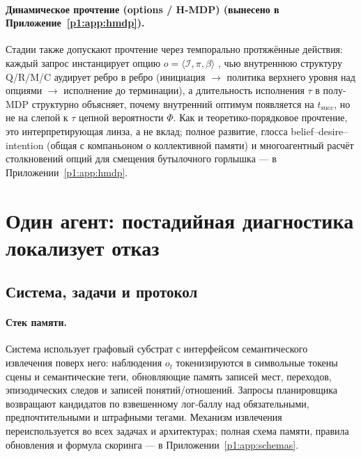 \documentclass{article}
\begin{document}
\paragraph{Динамическое прочтение (options / H-MDP) (вынесено в Приложение~\ref{p1:app:hmdp}).}
Стадии также допускают прочтение через темпорально протяжённые действия: каждый запрос инстанцирует опцию $o=\langle\mathcal{I},\pi,\beta\rangle$ \citep{sutton1999between}, чью внутреннюю структуру Q/R/M/C аудирует ребро в ребро (инициация $\to$ политика верхнего уровня над опциями $\to$ исполнение до терминации), а длительность исполнения $\tau$ в полу-MDP структурно объясняет, почему внутренний оптимум появляется на $t_{\mathrm{succ}}$, но не на слепой к $\tau$ цепной вероятности $\Phi$. Как и теоретико-порядковое прочтение, это интерпретирующая линза, а не вклад; полное развитие, глосса belief--desire--intention (общая с компаньоном о коллективной памяти) и многоагентный расчёт столкновений опций для смещения бутылочного горлышка --- в Приложении~\ref{p1:app:hmdp}.

\section{Один агент: постадийная диагностика локализует отказ}
\label{p1:sec:single}

\subsection{Система, задачи и протокол}
\label{p1:sec:single-setup}

\paragraph{Стек памяти.}
Система использует графовый субстрат с интерфейсом семантического извлечения поверх него: наблюдения $o_t$ токенизируются в символьные токены сцены и семантические теги, обновляющие память записей мест, переходов, эпизодических следов и записей понятий/отношений. Запросы планировщика возвращают кандидатов по взвешенному лог-баллу над обязательными, предпочтительными и штрафными тегами. Механизм извлечения переиспользуется во всех задачах и архитектурах; полная схема памяти, правила обновления и формула скоринга --- в Приложении~\ref{p1:app:schemas}.
\end{document}
